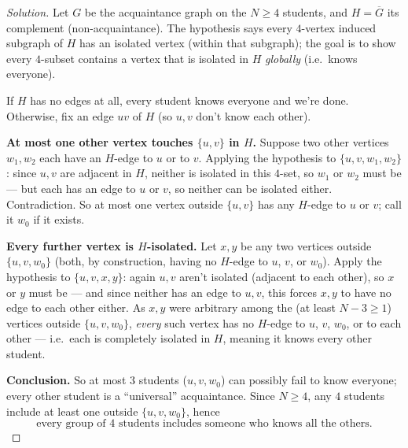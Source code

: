 \documentclass[11pt]{article}
\theoremstyle{definition}
\begin{document}
\begin{proof}[Solution]
Let $G$ be the acquaintance graph on the $N\ge4$ students, and $H=\overline G$ its complement (non-acquaintance). The hypothesis says every $4$-vertex induced subgraph of $H$ has an isolated vertex (within that subgraph); the goal is to show every $4$-subset contains a vertex that is isolated in $H$ \emph{globally} (i.e.\ knows everyone).

If $H$ has no edges at all, every student knows everyone and we're done. Otherwise, fix an edge $uv$ of $H$ (so $u,v$ don't know each other).

\textbf{At most one other vertex touches $\{u,v\}$ in $H$.} Suppose two other vertices $w_1,w_2$ each have an $H$-edge to $u$ or to $v$. Applying the hypothesis to $\{u,v,w_1,w_2\}$: since $u,v$ are adjacent in $H$, neither is isolated in this $4$-set, so $w_1$ or $w_2$ must be — but each has an edge to $u$ or $v$, so neither can be isolated either. Contradiction. So at most one vertex outside $\{u,v\}$ has any $H$-edge to $u$ or $v$; call it $w_0$ if it exists.

\textbf{Every further vertex is $H$-isolated.} Let $x,y$ be any two vertices outside $\{u,v,w_0\}$ (both, by construction, having no $H$-edge to $u$, $v$, or $w_0$). Apply the hypothesis to $\{u,v,x,y\}$: again $u,v$ aren't isolated (adjacent to each other), so $x$ or $y$ must be — and since neither has an edge to $u,v$, this forces $x,y$ to have no edge to each other either. As $x,y$ were arbitrary among the (at least $N-3\ge1$) vertices outside $\{u,v,w_0\}$, \emph{every} such vertex has no $H$-edge to $u$, $v$, $w_0$, or to each other — i.e.\ each is completely isolated in $H$, meaning it knows every other student.

\textbf{Conclusion.} So at most $3$ students ($u,v,w_0$) can possibly fail to know everyone; every other student is a ``universal'' acquaintance. Since $N\ge4$, any $4$ students include at least one outside $\{u,v,w_0\}$, hence
\[
\boxed{\text{every group of } 4 \text{ students includes someone who knows all the others}}.
\]
\end{proof}
\end{document}

